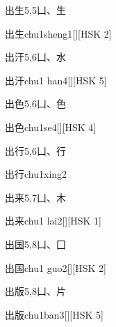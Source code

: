 \begin{entry}{出生}{5,5}{⼐、⽣}
  \begin{phonetics}{出生}{chu1sheng1}[][HSK 2]
  \end{phonetics}
\end{entry}

\begin{entry}{出汗}{5,6}{⼐、⽔}
  \begin{phonetics}{出汗}{chu1 han4}[][HSK 5]
  \end{phonetics}
\end{entry}

\begin{entry}{出色}{5,6}{⼐、⾊}
  \begin{phonetics}{出色}{chu1se4}[][HSK 4]
  \end{phonetics}
\end{entry}

\begin{entry}{出行}{5,6}{⼐、⾏}
  \begin{phonetics}{出行}{chu1xing2}
  \end{phonetics}
\end{entry}

\begin{entry}{出来}{5,7}{⼐、⽊}
  \begin{phonetics}{出来}{chu1 lai2}[][HSK 1]
  \end{phonetics}
\end{entry}

\begin{entry}{出国}{5,8}{⼐、⼞}
  \begin{phonetics}{出国}{chu1 guo2}[][HSK 2]
  \end{phonetics}
\end{entry}

\begin{entry}{出版}{5,8}{⼐、⽚}
  \begin{phonetics}{出版}{chu1ban3}[][HSK 5]
  \end{phonetics}
\end{entry}

